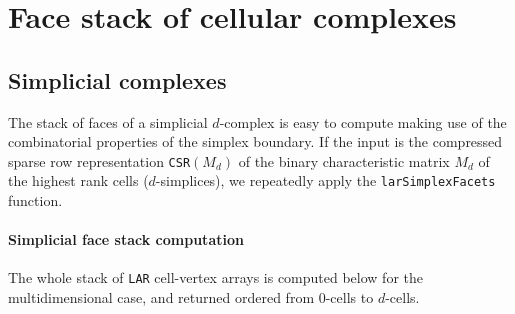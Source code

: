 \documentclass[11pt,oneside]{article}	%
\begin{document}
\section{Face stack of cellular complexes}
\label{sec:facestack}

\subsection{Simplicial complexes}

The stack of faces of a simplicial $d$-complex is easy to compute making use of the combinatorial properties of the simplex boundary. If the input is the compressed sparse row representation \texttt{CSR}$(M_d)$ of the binary characteristic matrix $M_d$ of the highest rank cells ($d$-simplices), we repeatedly apply the \texttt{larSimplexFacets} function.

\paragraph{Simplicial face stack computation}
The whole stack of \texttt{LAR} cell-vertex arrays is computed below for the multidimensional case, and returned ordered from 0-cells to $d$-cells.
\end{document}
